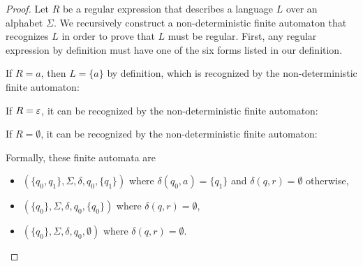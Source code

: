 \begin{proof}
    Let $R$ be a regular expression that describes a language $L$ over an alphabet $\Sigma$. We recursively construct a non-deterministic finite automaton that recognizes $L$ in order to prove that $L$ must be regular. First, any regular expression by definition must have one of the six forms listed in our definition.

    If $R = a$, then $L = \{a\}$ by definition, which is recognized by the non-deterministic finite automaton:
    \begin{figure}[ht!]
        \centering
    \end{figure}

    If $R = \varepsilon$, it can be recognized by the non-deterministic finite automaton:
    \begin{figure}[ht!]
        \centering
    \end{figure}

    If $R = \emptyset$, it can be recognized by the non-deterministic finite automaton:
    \begin{figure}[ht!]
        \centering
    \end{figure}

    Formally, these finite automata are
    \begin{itemize}
        \item $(\{q_0, q_1\}, \Sigma, \delta, q_0, \{q_1\})$ where $\delta(q_0, a) = \{q_1\}$ and $\delta(q, r) = \emptyset$ otherwise,
        \item $(\{q_0\}, \Sigma, \delta, q_0, \{q_0\})$ where $\delta(q, r) = \emptyset$,
        \item $(\{q_0\}, \Sigma, \delta, q_0, \emptyset)$ where $\delta(q, r) = \emptyset$.
    \end{itemize}


\end{proof}

